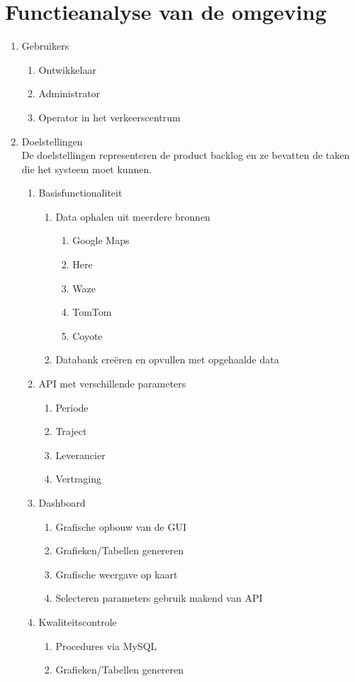 \documentclass[ps,a4paper,oneside]{report}
\begin{document}
\section{Functieanalyse van de omgeving}
\begin{enumerate}
	\item Gebruikers
	\begin{enumerate}
		\item Ontwikkelaar
		\item Administrator
		\item Operator in het verkeerscentrum
	\end{enumerate}
\item Doelstellingen\\
De doelstellingen representeren de product backlog en ze bevatten de taken die het systeem moet kunnen.
\begin{enumerate}
	\item Basisfunctionaliteit
		\begin{enumerate}
			\item Data ophalen uit meerdere bronnen
			\begin{enumerate}
				\item Google Maps
				\item Here
				\item Waze
				\item TomTom
				\item Coyote
			\end{enumerate}
			\item Databank cre\"eren en opvullen met opgehaalde data
		\end{enumerate}
	\item API met verschillende parameters
	\begin{enumerate}
		\item Periode
		\item Traject
		\item Leverancier
		\item Vertraging
	\end{enumerate}
	\item Dashboard
	\begin{enumerate}
		\item Grafische opbouw van de GUI
		\item Grafieken/Tabellen genereren
		\item Grafische weergave op kaart
		\item Selecteren parameters gebruik makend van API
	\end{enumerate}	
	\item Kwaliteitscontrole
	\begin{enumerate}
		\item Procedures via MySQL
		\item Grafieken/Tabellen genereren
	\end{enumerate}
\end{enumerate}
\end{enumerate}
\end{document}
